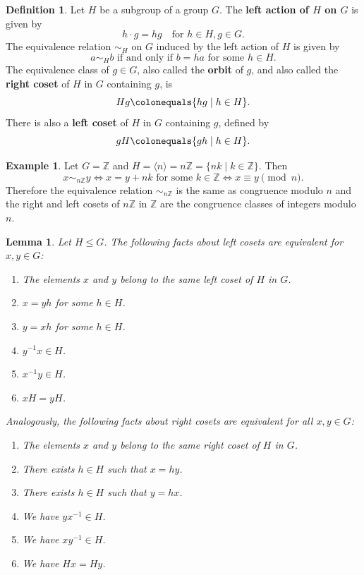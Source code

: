 \documentclass[12pt]{report}
\newtheorem{lemma}[theorem]{Lemma}
\numberwithin{equation}{section}
\numberwithin{theorem}{chapter}
\theoremstyle{definition}
\newtheorem{definition}[theorem]{Definition}
\newtheorem{example}[theorem]{Example}
\newtheorem*{basic properties}{Basic Properties}
\newtheorem*{Important Remark}{Important Remark}
\newcommand{\Z}{\mathbb{Z}}
\begin{document}
\begin{definition}
 Let $H$ be a subgroup of a group $G$. The {\bf left action of $H$ on $G$} is given by 
 $$h\cdot g=hg \quad \textrm{for } h\in H, g\in G.$$ 
 The equivalence relation $\sim_H$ on $G$ induced by the left action of $H$ is given by 
 $$a \sim_H b \textrm{ if and only if } b = ha \text{ for some } h \in H.$$ 
 The equivalence class of $g \in G$, also called the {\bf orbit} of $g$, and also called the {\bf right coset} of $H$ in $G$ containing $g$, is
 $$Hg \colonequals \{hg \mid h \in H\}.$$ 
 There is also a {\bf left coset} of $H$ in $G$ containing $g$, defined by
 $$gH \colonequals \{gh \mid h \in H\}.$$ 
\end{definition}


\begin{example}
Let $G=\Z$ and $H=\langle n\rangle=n\Z=\{nk \mid k\in \Z\}$. Then 
$$x\sim_{ n\Z} y \iff x=y+nk \textrm{ for some } k\in \Z \iff x\equiv y \!\!\!\!\pmod n.$$ 
Therefore the equivalence relation $\sim_{ n\Z}$ is the same as congruence modulo $n$ and the right and left cosets of $n\Z$ in $\Z$ are the congruence classes of integers modulo $n$. 
\end{example}




\begin{lemma}\label{cosets}
Let $H \leq G$. The following facts about left cosets are equivalent for $x,y \in G$:

\vspace{-0.5em}
\begin{enumerate}[label=\arabic*.,leftmargin=15pt,itemsep=-0.1em]
\item The elements $x$ and $y$ belong to the same left coset of $H$ in $G$.
\item $x = yh$ for some $h \in H$.
\item $y = xh$ for some $h \in H$.
\item $y^{-1}x \in H$.
\item $x^{-1}y \in H$.
\item $xH = yH$.
\end{enumerate}

\vspace{-0.5em}

Analogously, the following facts about right cosets are equivalent for all $x,y \in G$:
\begin{enumerate}[label=\arabic*.,leftmargin=15pt,itemsep=-0.1em]
\item The elements $x$ and $y$ belong to the same right coset of $H$ in $G$.
\item There exists $h \in H$ such that $x = hy$.
\item There exists $h \in H$ such that $y = hx$.
\item We have $yx^{-1} \in H$.
\item We have $xy^{-1} \in H$.
\item We have $Hx = Hy$.
\end{enumerate}
\end{lemma}
\end{document}
